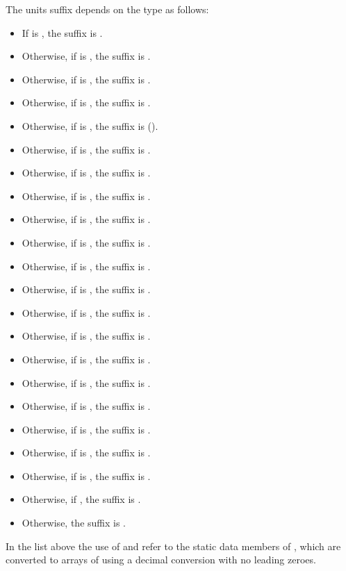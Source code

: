 \begin{itemdescr}
\pnum
The units suffix depends on the type  as follows:
\begin{itemize}
\item If  is , the suffix is .
\item Otherwise, if  is , the suffix is .
\item Otherwise, if  is , the suffix is .
\item Otherwise, if  is , the suffix is .
\item Otherwise, if  is , the suffix is  ().
\item Otherwise, if  is , the suffix is .
\item Otherwise, if  is , the suffix is .
\item Otherwise, if  is , the suffix is .
\item Otherwise, if  is , the suffix is .
\item Otherwise, if  is , the suffix is .
\item Otherwise, if  is , the suffix is .
\item Otherwise, if  is , the suffix is .
\item Otherwise, if  is , the suffix is .
\item Otherwise, if  is , the suffix is .
\item Otherwise, if  is , the suffix is .
\item Otherwise, if  is , the suffix is .
\item Otherwise, if  is , the suffix is .
\item Otherwise, if  is , the suffix is .
\item Otherwise, if  is , the suffix is .
\item Otherwise, if  is , the suffix is .
\item Otherwise, if , the suffix is .
\item Otherwise, the suffix is .
\end{itemize}
In the list above the use of  and 
refer to the static data members of ,
which are converted to arrays of  using a decimal conversion with no leading zeroes.


\end{itemdescr}
